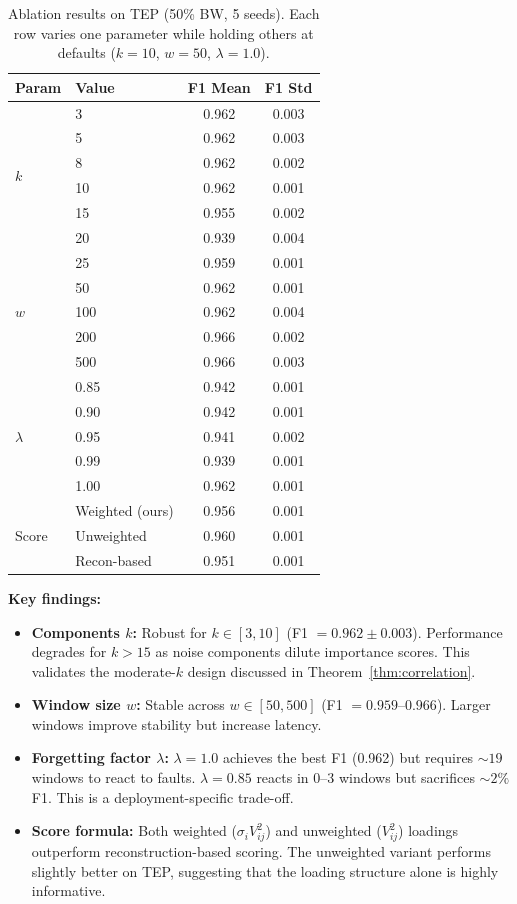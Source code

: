 \documentclass[journal]{IEEEtran}
\begin{document}
\begin{table}[t]
\centering
\caption{Ablation results on TEP (50\% BW, 5 seeds). Each row varies one parameter while holding others at defaults ($k{=}10$, $w{=}50$, $\lambda{=}1.0$).}
\begin{tabular}{@{}llcc@{}}
\toprule
\textbf{Param} & \textbf{Value} & \textbf{F1 Mean} & \textbf{F1 Std} \\
\midrule
\multirow{6}{*}{$k$} & 3 & 0.962 & 0.003 \\
& 5 & 0.962 & 0.003 \\
& 8 & 0.962 & 0.002 \\
& 10 & 0.962 & 0.001 \\
& 15 & 0.955 & 0.002 \\
& 20 & 0.939 & 0.004 \\
\midrule
\multirow{5}{*}{$w$} & 25 & 0.959 & 0.001 \\
& 50 & 0.962 & 0.001 \\
& 100 & 0.962 & 0.004 \\
& 200 & 0.966 & 0.002 \\
& 500 & 0.966 & 0.003 \\
\midrule
\multirow{5}{*}{$\lambda$} & 0.85 & 0.942 & 0.001 \\
& 0.90 & 0.942 & 0.001 \\
& 0.95 & 0.941 & 0.002 \\
& 0.99 & 0.939 & 0.001 \\
& 1.00 & 0.962 & 0.001 \\
\midrule
\multirow{3}{*}{Score} & Weighted (ours) & 0.956 & 0.001 \\
& Unweighted & 0.960 & 0.001 \\
& Recon-based & 0.951 & 0.001 \\
\bottomrule
\end{tabular}
\label{tab:ablation}
\end{table}

\textbf{Key findings:}
\begin{itemize}[leftmargin=*]
\item \textbf{Components $k$:} Robust for $k \in [3, 10]$ (F1 $= 0.962 \pm 0.003$). Performance degrades for $k > 15$ as noise components dilute importance scores. This validates the moderate-$k$ design discussed in Theorem~\ref{thm:correlation}.
\item \textbf{Window size $w$:} Stable across $w \in [50, 500]$ (F1 $= 0.959$--$0.966$). Larger windows improve stability but increase latency.
\item \textbf{Forgetting factor $\lambda$:} $\lambda = 1.0$ achieves the best F1 (0.962) but requires ${\sim}19$ windows to react to faults. $\lambda = 0.85$ reacts in 0--3 windows but sacrifices ${\sim}2\%$ F1. This is a deployment-specific trade-off.
\item \textbf{Score formula:} Both weighted ($\sigma_i V_{ij}^2$) and unweighted ($V_{ij}^2$) loadings outperform reconstruction-based scoring. The unweighted variant performs slightly better on TEP, suggesting that the loading structure alone is highly informative.
\end{itemize}
\end{document}
